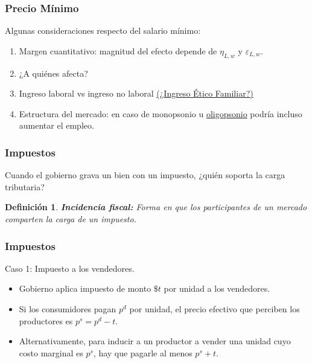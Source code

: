 \documentclass[dvipsnames,table,leqno]{beamer}
\newtheorem{mydef}{Definición}
\newcommand{\peq}[1]{{\scriptscriptstyle{#1}}}
\begin{document}
		\begin{frame}
			\frametitle{Precio Mínimo}
			Algunas consideraciones respecto del salario mínimo:
			\begin{enumerate}
				\item Margen cuantitativo: magnitud del efecto depende de $\eta_\peq{L,w}$ y $\varepsilon_\peq{L,w}$.
				\item ¿A quiénes afecta?
				\item Ingreso laboral vs ingreso no laboral \href{http://www.ingresoetico.gob.cl/que-es-ief/}{(¿Ingreso Ético Familiar?)}
				\item Estructura del mercado: en caso de monopsonio u \href{http://webcurso.uc.cl/access/content/group/eae105a-9-22-2017/Bhaskar\%2C\%20Manning\%20_\%20To\%20_2002_\%20-\%20Oligopsony\%20and\%20Monopsonistic\%20Competition\%20in\%20Labor\%20Markets.pdf}{oligopsonio} podría incluso aumentar el empleo. 
			\end{enumerate}
		\end{frame}

		\begin{frame}
			\frametitle{Impuestos}
			Cuando el gobierno grava un bien con un impuesto, ¿quién soporta la carga tributaria?
			\begin{mydef}
				\textbf{Incidencia fiscal:} Forma en que los participantes de un mercado comparten la carga de un impuesto.
			\end{mydef}
		\end{frame}

		\begin{frame}
			\frametitle{Impuestos}
			Caso 1: Impuesto a los vendedores.
			\begin{itemize}
				\item Gobierno aplica impuesto de monto $\$t$ por unidad a los vendedores.
				\item Si los consumidores pagan $p^\peq{d}$ por unidad, el precio efectivo que perciben los productores es $p^\peq{s}=p^\peq{d}-t$.
				\item Alternativamente, para inducir a un productor a vender una unidad cuyo costo marginal es $p^\peq{s}$, hay que pagarle al menos $p^\peq{s}+t$.
			\end{itemize}
		\end{frame}
\end{document}
